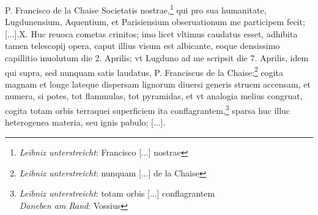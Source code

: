 \pend \pstart[p.~180] P. Francisco de la Chaise\protect{} Societatis nostrae,\footnote{\textit{Leibniz unterstreicht}: Francisco [...] nostrae} qui pro sua humanitate, Lugdunensium, Aquentium, et Parisiensium obseruationum me participem fecit; [...].\pend \pstart X. Huc reuoca cometas crinitos\protect{}; imo licet vltimus caudatus esset, adhibita tamen telescopij\protect{} opera, caput illius visum est albicante, eoque densissimo capillitio inuolutum die 2. Aprilis; vt Lugduno\protect{} ad me scripsit die 7. Aprilis, idem qui supra, sed nunquam satis laudatus, P. Franciscus de la Chaise\protect{}:\footnote{\textit{Leibniz unterstreicht}: nunquam [...] de la Chaise} cogita magnam et longe lateque dispersam lignorum diuersi generis struem accensam, et numera, si potes, tot flammulas, tot pyramidas, et vt analogia melius congruat, cogita totam orbis terraquei superficiem ita conflagrantem,\footnote{\textit{Leibniz unterstreicht}: totam orbis [...] conflagrantem\\ \textit{Daneben am Rand}: Vossius\protect{}} sparsa huc illuc heterogenea materia, seu ignis pabulo; [...]. 